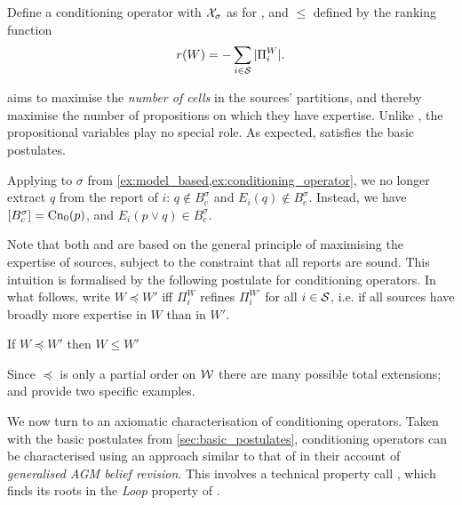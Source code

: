 \begin{definition}
    Define a conditioning operator \partbasedcond{} with $\X_\sigma$ as
    for \varbasedcond{}, and $\le$ defined by the ranking function
    \[
        r(W) = -\sum_{i \in \S}{|\Pi^W_i|}.
    \]
\end{definition}

\partbasedcond{} aims to maximise the \emph{number of cells} in the sources'
partitions, and thereby maximise the number of propositions on which they have
expertise. Unlike \varbasedcond{}, the propositional variables play no special
role. As expected, \partbasedcond{} satisfies the basic postulates.

\begin{example}
    Applying \partbasedcond{} to $\sigma$ from
    \cref{ex:model_based,ex:conditioning_operator}, we no longer extract $q$
    from the report of $i$: $q \notin B^\sigma_c$ and $E_i(q) \notin
    B^\sigma_c$. Instead, we have $\proppart{B^\sigma_c} = \cnprop(p)$, and
    $E_i(p \lor q) \in B^\sigma_c$.
\end{example}

Note that both \varbasedcond{} and \partbasedcond{} are based on the general
principle of maximising the expertise of sources, subject to the constraint
that all reports are sound. This intuition is formalised by the following
postulate for conditioning operators. In what follows, write $W \preceq W'$ iff
$\Pi^W_i$ refines $\Pi^{W'}_i$ for all $i \in \S$, i.e. if all sources have
broadly more expertise in $W$ than in $W'$.\footnotemark{}


\begin{postulate}[\refinement{}]
    If $W \preceq W'$ then $W \le W'$
\end{postulate}

Since $\preceq$ is only a partial order on $\W$ there are many possible total
extensions; \varbasedcond{} and \partbasedcond{} provide two specific examples.

We now turn to an axiomatic characterisation of conditioning operators.
Taken with the basic postulates from \cref{sec:basic_postulates},
conditioning operators can be characterised using an approach similar to that of
\textcite{delgrande2018general} in their account of \emph{generalised AGM belief
revision}.\footnotemark{} This involves a technical property
\citeauthor{delgrande2018general}
call , which finds its roots in the \emph{Loop}
property of \textcite{kraus1990nonmonotonic}.
%


